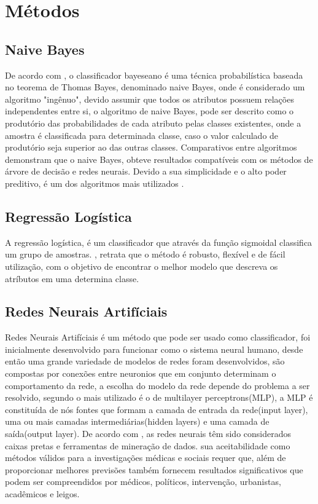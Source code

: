\documentclass[10pt, conference, compsocconf]{IEEEtran}
\begin{document}
\section{Métodos}\label{metodos}
\subsection{Naive Bayes}
De acordo com \cite{4}, o classificador bayeseano é uma técnica probabilística baseada no teorema de Thomas Bayes, denominado naive Bayes, onde é considerado um algoritmo "ingênuo", devido assumir que todos os atributos possuem relações independentes entre si, o algoritmo de naive Bayes, pode ser descrito como o produtório das probabilidades de cada atributo pelas classes existentes, onde a amostra é classificada para determinada classe, caso o valor calculado de produtório seja superior ao das outras classes. Comparativos entre algoritmos demonstram que o naive Bayes, obteve resultados compatíveis com os métodos de árvore de decisão e redes neurais. Devido a sua simplicidade e o alto poder preditivo, é um dos algoritmos mais utilizados \cite{5}.
 
\subsection{Regressão Logística}
A regressão logística, é um classificador que através da função sigmoidal classifica um grupo de amostras. \cite{6}, retrata que o método é robusto, flexível e de fácil utilização, com o objetivo de encontrar o melhor modelo que descreva os atríbutos em uma determina classe.

\subsection{Redes Neurais Artifíciais}
Redes Neurais Artifíciais é um método que pode ser usado como classificador, foi inicialmente desenvolvido para funcionar como o sistema neural humano, desde então uma grande variedade de modelos de redes foram desenvolvidos, são compostas por conexões entre neuronios que em conjunto determinam o comportamento da rede, a escolha do modelo da rede depende do problema a ser resolvido, segundo \cite{7} o mais utilizado é o de multilayer perceptrons(MLP), a MLP é constituída de nós fontes que formam a camada de entrada da rede(input layer), uma ou mais camadas intermediárias(hidden layers) e uma camada de saída(output layer). De acordo com \cite{11}, as redes neurais têm sido considerados caixas pretas e ferramentas de mineração de dados. sua aceitabilidade como métodos válidos para a investigações médicas e sociais requer que, além de proporcionar melhores previsões também fornecem resultados significativos que podem ser compreendidos por médicos, políticos, intervenção, urbanistas, acadêmicos e leigos.
\end{document}
